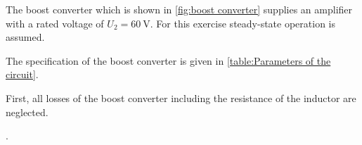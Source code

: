 

The boost converter which is shown in \autoref{fig:boost converter} supplies an amplifier with a rated voltage of $U_{\mathrm{2}} = \SI{60}{\volt}$. For this exercise steady-state operation is assumed.



The specification of the boost converter is given in \autoref{table:Parameters of the circuit}.



First, all losses of the boost converter including the resistance of the inductor are neglected.

.

